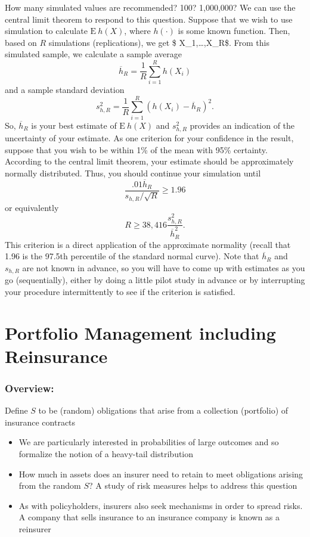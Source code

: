 \documentclass[]{book}
\theoremstyle{definition}
\theoremstyle{definition}
\theoremstyle{definition}
\theoremstyle{remark}
\begin{document}
How many simulated values are recommended? 100? 1,000,000? We can use
the central limit theorem to respond to this question. Suppose that we
wish to use simulation to calculate \(\mathrm{E~}h(X)\), where
\(h(\cdot)\) is some known function. Then, based on \(R\) simulations
(replications), we get \$ X\_1,\ldots,X\_R\$. From this simulated
sample, we calculate a sample average
\[\overline{h}_R=\frac{1}{R}\sum_{i=1}^{R} h(X_i)\] and a sample
standard deviation
\[s_{h,R}^2 = \frac{1}{R} \sum_{i=1}^{R}\left( h(X_i) -\overline{h}_R
\right) ^2.\] So, \(\overline{h}_R\) is your best estimate of
\(\mathrm{E~}h(X)\) and \(s_{h,R}^2\) provides an indication of the
uncertainty of your estimate. As one criterion for your confidence in
the result, suppose that you wish to be within 1\% of the mean with 95\%
certainty. According to the central limit theorem, your estimate should
be approximately normally distributed. Thus, you should continue your
simulation until \[\frac{.01\overline{h}_R}{s_{h,R}/\sqrt{R}}\geq 1.96\]
or equivalently \[R \geq 38,416\frac{s_{h,R}^2}{\overline{h}_R^2}.\]
This criterion is a direct application of the approximate normality
(recall that 1.96 is the 97.5th percentile of the standard normal
curve). Note that \(\overline{h}_R\) and \(s_{h,R}\) are not known in
advance, so you will have to come up with estimates as you go
(sequentially), either by doing a little pilot study in advance or by
interrupting your procedure intermittently to see if the criterion is
satisfied.

\chapter{Portfolio Management including
Reinsurance}\label{portfolio-management-including-reinsurance}

\subsection{Overview:}\label{overview}

Define \(S\) to be (random) obligations that arise from a collection
(portfolio) of insurance contracts

\begin{itemize}
\item
  We are particularly interested in probabilities of large outcomes and
  so formalize the notion of a heavy-tail distribution
\item
  How much in assets does an insurer need to retain to meet obligations
  arising from the random \(S\)? A study of risk measures helps to
  address this question
\item
  As with policyholders, insurers also seek mechanisms in order to
  spread risks. A company that sells insurance to an insurance company
  is known as a reinsurer
\end{itemize}
\end{document}
